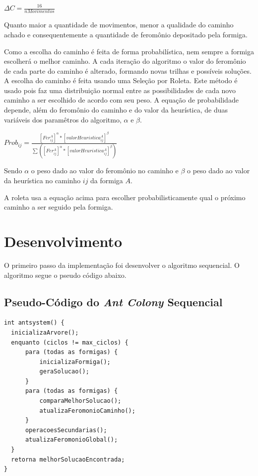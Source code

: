 \documentclass[12pt]{article}
\begin{document}
{\centering
    $\Delta C = \frac{16}{nMovimentos}$\par
}

Quanto maior a quantidade de movimentos, menor a qualidade do caminho achado e consequentemente a quantidade de feromônio depositado pela formiga. 

Como a escolha do caminho é feita de forma probabilística, nem sempre a formiga escolherá o melhor caminho. A cada iteração do algoritmo o valor do feromônio de cada parte do caminho é alterado, formando novas trilhas e possíveis soluções. A escolha do caminho é feita usando uma Seleção por Roleta. Este método é usado pois faz uma distribuição normal entre as possibilidades de cada novo caminho a ser escolhido de acordo com seu peso. A equação de probabilidade depende, além do feromônio do caminho e do valor da heurística, de duas variáveis dos paramêtros do algoritmo, $\alpha$ e $\beta$.

{\centering
    $Prob_{ij} = \frac{\left [ Fer_{ij}^{A} \right ]^{\alpha} * \left [ valorHeuristica_{ij}^{A} \right ]^{\beta}}{\sum \left (\left [ Fer_{ij}^{A} \right ]^{\alpha} * \left [ valorHeuristica_{ij}^{A} \right ]^{\beta}  \right )}$\par
}

Sendo $\alpha$ o peso dado ao valor do feromônio no caminho e $\beta$ o peso dado ao valor da heurística no caminho $ij$ da formiga $A$. 

A roleta usa a equação acima para escolher probabilisticamente qual o próximo caminho a ser seguido pela formiga. 

\section{Desenvolvimento}
O primeiro passo da implementação foi desenvolver o algoritmo sequencial. O algoritmo segue o pseudo código abaixo.
\subsection{Pseudo-Código do \textit{Ant Colony} Sequencial}

\begin{lstlisting}
int antsystem() {
  inicializaArvore();
  enquanto (ciclos != max_ciclos) {
      para (todas as formigas) {
          inicializaFormiga();
          geraSolucao();
      }
      para (todas as formigas) {
          comparaMelhorSolucao();
          atualizaFeromonioCaminho();
      }      
      operacoesSecundarias();
      atualizaFeromonioGlobal();
  }
  retorna melhorSolucaoEncontrada;
}      
\end{lstlisting}
\end{document}
